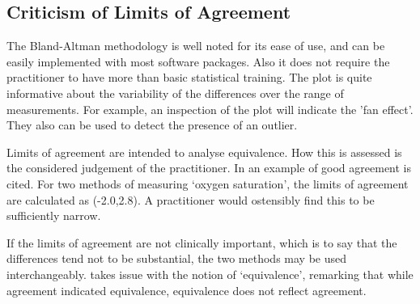 \documentclass[12pt, a4paper]{report}
\theoremstyle{plain}
\theoremstyle{definition}
\theoremstyle{remark}
\begin{document}









\subsection{Criticism of Limits of Agreement }
The Bland-Altman methodology is well noted for its ease of use,
and can be easily implemented with most software packages. Also it
does not require the practitioner to have more than basic
statistical training. The plot is quite informative about the
variability of the differences over the range of measurements. For
example, an inspection of the plot will indicate the 'fan effect'.
They also can be used to detect the presence of an outlier.

Limits of agreement are intended to analyse equivalence. How this
is assessed is the considered judgement of the practitioner. In
\citet{BA86} an example of good agreement is cited. For two
methods of measuring `oxygen saturation', the limits of agreement
are calculated as (-2.0,2.8). A practitioner would ostensibly find
this to be sufficiently narrow.

If the limits of agreement are not clinically important, which is
to say that the differences tend not to be substantial, the two
methods may be used interchangeably. \citet{DunnSEME} takes issue
with the notion of `equivalence', remarking that while agreement
indicated equivalence, equivalence does not reflect agreement.
\end{document}

